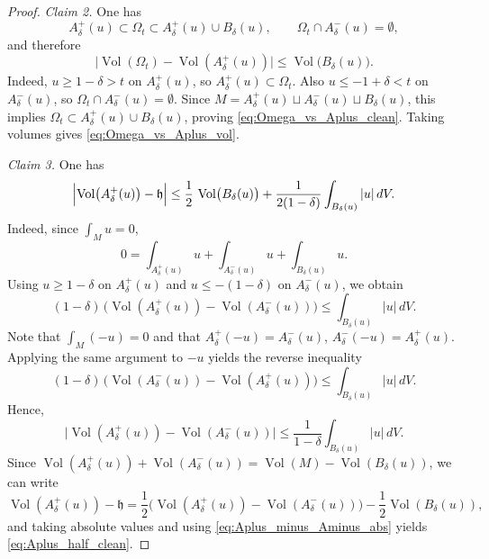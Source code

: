 \documentclass[12pt,english]{article}
\theoremstyle{definition}
\begin{document}
\begin{proof}
\smallskip
\noindent\emph{Claim 2.} One has
\begin{equation}\label{eq:Omega_vs_Aplus_clean}
A^+_\delta(u)\subset \Omega_t\subset A^+_\delta(u)\cup B_\delta(u),
\qquad
\Omega_t\cap A^-_\delta(u)=\emptyset,
\end{equation}
and therefore
\begin{equation}\label{eq:Omega_vs_Aplus_vol}
\bigl|\operatorname{Vol}(\Omega_t)-\operatorname{Vol}(A^+_\delta(u))\bigr|\le \operatorname{Vol}\bigl(B_\delta(u)\bigr).
\end{equation}
Indeed, $u\ge 1-\delta>t$ on $A^+_\delta(u)$, so $A^+_\delta(u)\subset \Omega_t$.
Also $u\le -1+\delta<t$ on $A^-_\delta(u)$, so $\Omega_t\cap A^-_\delta(u)=\emptyset$.
Since $M=A^+_\delta(u)\sqcup A^-_\delta(u)\sqcup B_\delta(u)$, this implies
$\Omega_t\subset A^+_\delta(u)\cup B_\delta(u)$, proving \eqref{eq:Omega_vs_Aplus_clean}.
Taking volumes gives \eqref{eq:Omega_vs_Aplus_vol}.

\smallskip
\noindent\emph{Claim 3.} One has
\begin{equation}\label{eq:Aplus_half_clean}
\Bigl|\operatorname{Vol}\bigl(A^+_\delta(u)\bigr)-\mathfrak h\Bigr|
\le \frac12\,\operatorname{Vol}\bigl(B_\delta(u)\bigr)+\frac{1}{2(1-\delta)}\int_{B_\delta(u)}|u|\,dV.
\end{equation}
Indeed, since $\int_M u=0$,
\[
0=\int_{A^+_\delta(u)}u+\int_{A^-_\delta(u)}u+\int_{B_\delta(u)}u.
\]
Using $u\ge 1-\delta$ on $A^+_\delta(u)$ and $u\le -(1-\delta)$ on $A^-_\delta(u)$, we obtain
\begin{equation}
(1-\delta)\,\bigl(\operatorname{Vol}(A^+_\delta(u))-\operatorname{Vol}(A^-_\delta(u))\bigr)
\le \int_{B_\delta(u)}|u|\,dV.
\end{equation}
Note that $\int_M (-u)=0$ and that
$A^+_\delta(-u)=A^-_\delta(u)$, $A^-_\delta(-u)=A^+_\delta(u)$. Applying the same argument to $-u$ yields the reverse inequality
\[
(1-\delta)\,\bigl(\operatorname{Vol}(A^-_\delta(u))-\operatorname{Vol}(A^+_\delta(u))\bigr)
\le \int_{B_\delta(u)}|u|\,dV.
\]
Hence,
\begin{equation}\label{eq:Aplus_minus_Aminus_abs}
\bigl|\operatorname{Vol}(A^+_\delta(u))-\operatorname{Vol}(A^-_\delta(u))\bigr|
\le \frac{1}{1-\delta}\int_{B_\delta(u)}|u|\,dV.
\end{equation}
Since $\operatorname{Vol}(A^+_\delta(u))+\operatorname{Vol}(A^-_\delta(u))=\operatorname{Vol}(M)-\operatorname{Vol}(B_\delta(u))$, we can write
\[
\operatorname{Vol}(A^+_\delta(u))-\mathfrak h
=\frac12\bigl(\operatorname{Vol}(A^+_\delta(u))-\operatorname{Vol}(A^-_\delta(u))\bigr)-\frac12\operatorname{Vol}(B_\delta(u)),
\]
and taking absolute values and using \eqref{eq:Aplus_minus_Aminus_abs} yields \eqref{eq:Aplus_half_clean}.


\end{proof}
\end{document}
